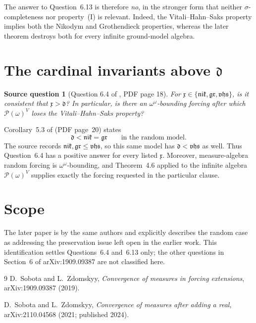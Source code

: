 \documentclass[11pt]{article}
\newtheorem*{sourcequestion}{Source question}
\begin{document}
The answer to Question~6.13 is therefore \emph{no}, in the stronger form that
neither $\sigma$-completeness nor property~(I) is relevant.  Indeed, the
Vitali--Hahn--Saks property implies both the Nikodym and Grothendieck
properties, whereas the later theorem destroys both for every infinite
ground-model algebra.

\section{The cardinal invariants above \texorpdfstring{$\mathfrak d$}{d}}

\begin{sourcequestion}[Question 6.4 of \cite{source}, PDF page 18]
For $\mathfrak x\in
\{\mathfrak{nik},\mathfrak{gr},\mathfrak{vhs}\}$, is it consistent that
$\mathfrak x>\mathfrak d$?  In particular, is there an
$\omega^\omega$-bounding forcing after which
$\mathcal P(\omega)^V$ loses the Vitali--Hahn--Saks property?
\end{sourcequestion}

Corollary~5.3 of \cite{answer} (PDF page~20) states
\[
 \mathfrak d<\mathfrak{nik}=\mathfrak{gr}
 \qquad\text{in the random model}.
\]
The source records
$\mathfrak{nik},\mathfrak{gr}\le\mathfrak{vhs}$, so this same model has
$\mathfrak d<\mathfrak{vhs}$ as well.  Thus Question~6.4 has a positive
answer for every listed $\mathfrak x$.  Moreover, measure-algebra random
forcing is $\omega^\omega$-bounding, and Theorem~4.6 applied to the infinite
algebra $\mathcal P(\omega)^V$ supplies exactly the forcing requested in the
particular clause.

\section*{Scope}

The later paper is by the same authors and explicitly describes the random
case as addressing the preservation issue left open in the earlier work.
This identification settles Questions~6.4 and~6.13 only; the other questions
in Section~6 of arXiv:1909.09387 are not classified here.

\begin{thebibliography}{9}
D.~Sobota and L.~Zdomskyy,
\emph{Convergence of measures in forcing extensions},
arXiv:1909.09387 (2019).

D.~Sobota and L.~Zdomskyy,
\emph{Convergence of measures after adding a real},
arXiv:2110.04568 (2021; published 2024).
\end{thebibliography}
\end{document}
